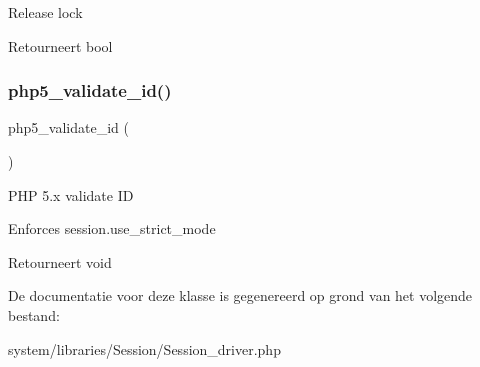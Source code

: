 Release lock

\begin{DoxyReturn}{Retourneert}
bool 
\end{DoxyReturn}
\mbox{\label{class_c_i___session__driver_ae2d4c0f64a46de5c8f8db759478f3a5f}} 
\subsubsection{\texorpdfstring{php5\_validate\_id()}{php5\_validate\_id()}}
{\footnotesize\ttfamily php5\+\_\+validate\+\_\+id (\begin{DoxyParamCaption}{ }\end{DoxyParamCaption})}

P\+HP 5.\+x validate ID

Enforces session.\+use\+\_\+strict\+\_\+mode

\begin{DoxyReturn}{Retourneert}
void 
\end{DoxyReturn}


De documentatie voor deze klasse is gegenereerd op grond van het volgende bestand\+:\begin{DoxyCompactItemize}
\item 
system/libraries/\+Session/Session\+\_\+driver.\+php\end{DoxyCompactItemize}
